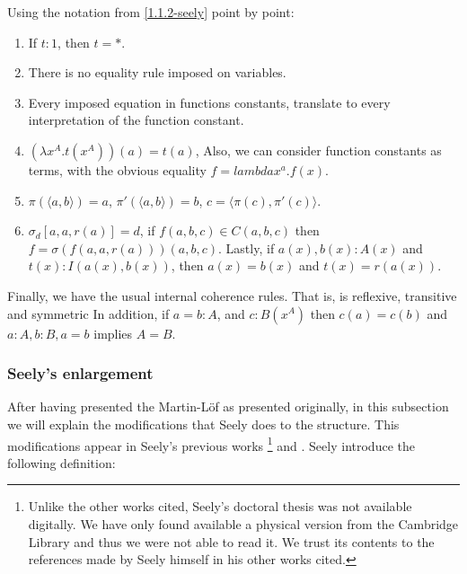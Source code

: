 \begin{definition}
  Using the notation from \ref{1.1.2-seely} point by point:
  \begin{enumerate}
  \item If $t:1$, then $t=*$.
  \item There is no equality rule imposed on variables.
  \item Every imposed equation in functions constants, translate to every interpretation of the function constant.
  \item $(\lambda x^A.t(x^A))(a) =  t(a)$, Also, we can consider function constants as terms, with the obvious equality $f = lambda x^a.f(x)$.
  \item $\pi(\langle a,b\rangle) = a$,  $\pi'(\langle a, b\rangle) = b$, $c=\langle \pi(c),\pi'(c)\rangle$.
  \item $\sigma_d[a,a,r(a)]=d$, if $f(a,b,c)\in C(a,b,c)$ then $f=\sigma(f(a,a,r(a)))(a,b,c)$. Lastly, if $a(x), b(x):A(x)$ and $t(x) : I(a(x),b(x))$, then $a(x)=b(x)$ and $t(x)=r(a(x))$.
  \end{enumerate}

  Finally, we have the  usual internal coherence rules. That is, is reflexive, transitive and symmetric In addition, if $a=b : A$, and $c:B(x^A)$ then $c(a)=c(b)$ and $a:A, b:B, a=b$ implies $A=B$.
\end{definition}

\subsubsection{Seely's enlargement}

After having presented the Martin-L\"of as presented originally, in this subsection we will explain the modifications that Seely does to the structure. This modifications appear in Seely's previous works \cite{seely1977hyperdoctrines}\footnote{Unlike the other works cited, Seely's doctoral thesis was not available digitally. We have only found available a physical version from the Cambridge Library and thus we were not able to read it. We trust its contents to the references made by Seely himself in his other works cited.} and \cite{seely1983hyperdoctrines}. Seely introduce the following definition:

